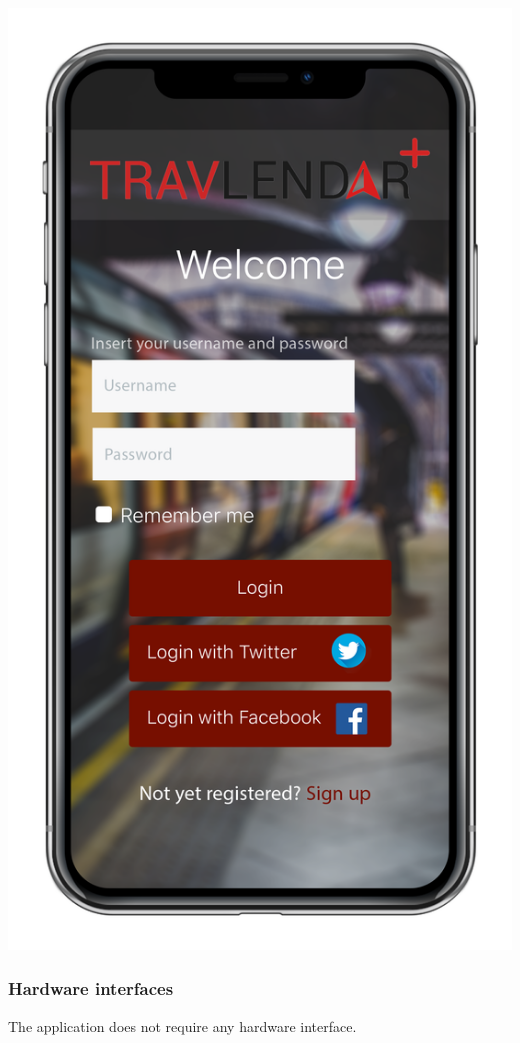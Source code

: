 \documentclass[12pt,titlepage]{article}
\begin{document}
\includegraphics[scale=0.15]{"iPhoneX_mockup LOGIN"} 

\subsubsection{Hardware interfaces}\label{sec:mod1}
The application does not require any hardware interface. 
\end{document}
